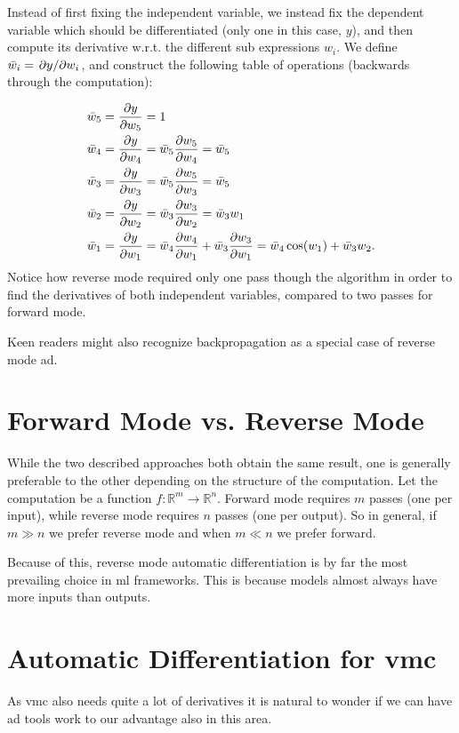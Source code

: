 \documentclass[Thesis.tex]{subfiles}
\begin{document}
Instead of first fixing the independent variable, we instead fix the dependent
variable which should be differentiated (only one in this case, \(y\)), and then
compute its derivative w.r.t. the different sub expressions $w_i$. We define
\(\bar w_i = \pdv*{y}{w_i}\), and construct the following table of operations
(backwards through the computation):

\begin{align*}
  \bar w_5 &= \pdv{y}{w_5} = 1\\
  \bar w_4 &= \pdv{y}{w_4} = \bar w_5\pdv{w_5}{w_4} = \bar w_5\\
  \bar w_3 &= \pdv{y}{w_3} = \bar w_5\pdv{w_5}{w_3} = \bar w_5\\
  \bar w_2 &= \pdv{y}{w_2} = \bar w_3\pdv{w_3}{w_2} = \bar w_3 w_1\\
  \bar w_1 &= \pdv{y}{w_1} = \bar w_4\pdv{w_4}{w_1} + \bar w_3 \pdv{w_3}{w_1}= \bar w_4 \cos(w_1) + \bar w_3w_2.
\end{align*}
Notice how reverse mode required only one pass though the algorithm in order to
find the derivatives of both independent variables, compared to two passes for
forward mode.

Keen readers might also recognize backpropagation as a special case of reverse mode \gls{ad}.

\section{Forward Mode vs. Reverse Mode}

While the two described approaches both obtain the same result, one is generally
preferable to the other depending on the structure of the computation. Let the
computation be a function $f: \mathbb{R}^{m}\to\mathbb{R}^n$. Forward mode
requires $m$ passes (one per input), while reverse mode requires $n$ passes (one
per output). So in general, if $m \gg n$ we prefer reverse mode and when $m\ll
n$ we prefer forward.

Because of this, reverse mode automatic differentiation is by far the most
prevailing choice in \gls{ml} frameworks. This is because models almost always have
more inputs than outputs.

\section{Automatic Differentiation for \gls{vmc}}

As \gls{vmc} also needs quite a lot of derivatives it is natural to wonder if we
can have \gls{ad} tools work to our advantage also in this area.
\end{document}
